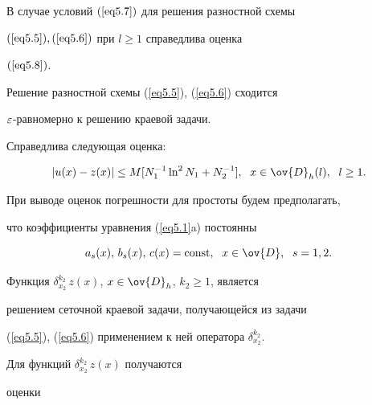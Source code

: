 \begin{lems}


В случае условий $(\ref{eq5.7})$ для решения разностной схемы


$(\ref{eq5.5}), (\ref{eq5.6})$ при $l\ge 1$ справедлива оценка


$(\ref{eq5.8})$.


\end{lems}





Решение разностной схемы (\ref{eq5.5}), (\ref{eq5.6}) сходится


$\varepsilon$-равномерно к решению краевой задачи.


Справедлива следующая оценка:


\begin{equation}


\label{eq5.9}


|u(x)-z(x)|\le M[N_1^{-1}\ln^2 N_1+N_2^{-1}],\ \;


x\in\ov{D}_h(l),\ \; l\ge 1.


\end{equation}





При выводе оценок погрешности для простоты будем предполагать,


что коэффициенты уравнения (\ref{eq5.1}a) постоянны


\begin{equation}


\label{eq5.10}


a_s(x),\,b_s(x),\,c(x)=\const,\ \; x\in\ov{D},\ \; s=1,2.


\end{equation}





Функция $\delta^{k_2}_{x_2}\,z(x)$, $x\in\ov{D}_h$, $k_2\ge 1$, является


решением сеточной краевой задачи, получающейся из задачи


(\ref{eq5.5}), (\ref{eq5.6}) применением к ней оператора $\delta^{k_2}_{x_2}$.


Для функций $\delta^{k_2}_{x_2}\,z(x)$ получаются


оценки


